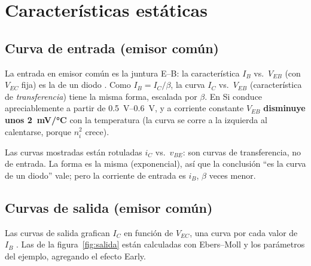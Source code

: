\section{Características estáticas}
\label{sec:caracteristicas}

\subsection{Curva de entrada (emisor común)}

La entrada en emisor común es la juntura E--B: la característica $I_B$ vs.\ $V_{EB}$ (con
$V_{EC}$ fija) es la de un diodo . Como $I_B=I_C/\beta$, la curva $I_C$ vs.\
$V_{EB}$ (característica de \emph{transferencia}) tiene la misma forma, escalada por $\beta$.
En Si conduce apreciablemente a partir de \SIrange{0.5}{0.6}{V}, y a corriente constante
$V_{EB}$ \textbf{disminuye unos \SI{2}{mV/\celsius}} con la temperatura (la curva se corre a la
izquierda al calentarse, porque $n_i^2$ crece).

\begin{ojo}[\diapo{1.28}]
Las curvas mostradas están rotuladas $i_C$ vs.\ $v_{BE}$: son curvas de transferencia, no de
entrada. La forma es la misma (exponencial), así que la conclusión ``es la curva de un
diodo'' vale; pero la corriente de entrada es $i_B$, $\beta$ veces menor.
\end{ojo}

\subsection{Curvas de salida (emisor común)}

Las curvas de salida grafican $I_C$ en función de $V_{EC}$, una curva por cada valor de $I_B$
\diapo{1.29}. Las de la figura~\ref{fig:salida} están calculadas con Ebers--Moll y los
parámetros del ejemplo, agregando el efecto Early.

